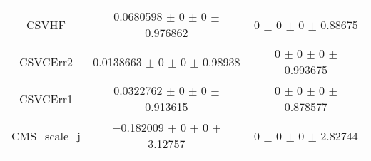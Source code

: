 \begin{table}
\begin{tabular}{ccc}
CSVHF & \num{0.0680598} $\pm$ \num{0} $\pm$ \num{0} $\pm$ \num{0.976862} & \num{0} $\pm$ \num{0} $\pm$ \num{0} $\pm$ \num{0.88675}\\
CSVCErr2 & \num{0.0138663} $\pm$ \num{0} $\pm$ \num{0} $\pm$ \num{0.98938} & \num{0} $\pm$ \num{0} $\pm$ \num{0} $\pm$ \num{0.993675}\\
CSVCErr1 & \num{0.0322762} $\pm$ \num{0} $\pm$ \num{0} $\pm$ \num{0.913615} & \num{0} $\pm$ \num{0} $\pm$ \num{0} $\pm$ \num{0.878577}\\
CMS\_scale\_j & \num{-0.182009} $\pm$ \num{0} $\pm$ \num{0} $\pm$ \num{3.12757} & \num{0} $\pm$ \num{0} $\pm$ \num{0} $\pm$ \num{2.82744}\\
\bottomrule
\end{tabular}
\end{table}